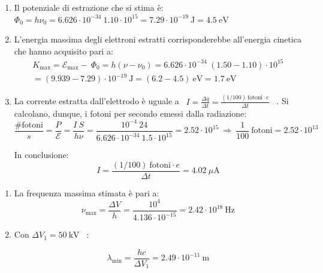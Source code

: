 \documentclass[12pt,twoside,a4]{article}
\begin{document}
\begin{solution}
\begin{enumerate}[label=(\textit{\roman*})]
	\item Il potenziale di estrazione che si stima è: $\Phi_0 = h \nu_0 = 6.626 \cdot 10^{-34} \ 1.10 \cdot 10^{15} = 7.29 \cdot 10^{-19} \ \mathrm{J} = 4.5 \ \mathrm{eV}$
	\item L'energia massima degli elettroni estratti corrisponderebbe all'energia cinetica che hanno acquisito pari a: 
\begin{gather} 
    K_{\mathrm{max}} = \mathcal{E}_{\mathrm{max}} - \  \Phi_0 = h (\nu - \nu_0) = 6.626 \cdot 10^{-34} \ (1.50 - 1.10 ) \cdot 10^{15} \\= (9.939 - 7.29) \cdot 10^{-19} \ \mathrm{J} = (6.2 - 4.5) \ \mathrm{eV} = 1.7 \ \mathrm{eV} 
\end{gather}

\item La corrente estratta dall'elettrodo è uguale a \ $I = \frac{\Delta q }{\Delta t} = \frac{(1/100) \ \mathrm{fotoni} \cdot e}{\Delta t}$ \ . Si calcolano, dunque, i fotoni per secondo emessi dalla radiazione: 
\begin{equation*}
 \frac{\mathrm{\#fotoni}}{s} = \frac{P}{\mathcal{E}} = \frac{I \ S}{h \nu} = \frac{10^{-4} \ 24}{6.626 \cdot 10^{-34} \ 1.5 \cdot 10^{15}} = 2.52 \cdot 10^{15}  \  \Rightarrow  \  \frac{1}{100} \ \mathrm{fotoni} = 2.52 \cdot 10^{13}  
\end{equation*}

In conclusione: \begin{equation*}
 I = \frac{(1/100) \ \mathrm{fotoni} \cdot e}{\Delta t} = 4.02 \ \mu \mathrm{A}   
\end{equation*}
\end{enumerate}

\end{solution}





\begin{solution}
\begin{enumerate}[label=(\textit{\roman*})]
	\item La frequenza massima stimata è pari a: \begin{equation*}
\nu_{\mathrm{max}} = \frac{\Delta V}{h} = \frac{10^4}{4.136 \cdot 10^{-15}} = 2.42 \cdot 10^{18} \ \mathrm{Hz}  
\end{equation*}

\item Con $\Delta V_1 = 50 \ \mathrm{kV}$ \ : 

\begin{equation*}
 \lambda_{\mathrm{min}} = \frac{h c}{\Delta V_1} = 2.49 \cdot 10^{-11} \ \mathrm{m}   
\end{equation*}

\end{enumerate}
\end{solution}
\end{document}
